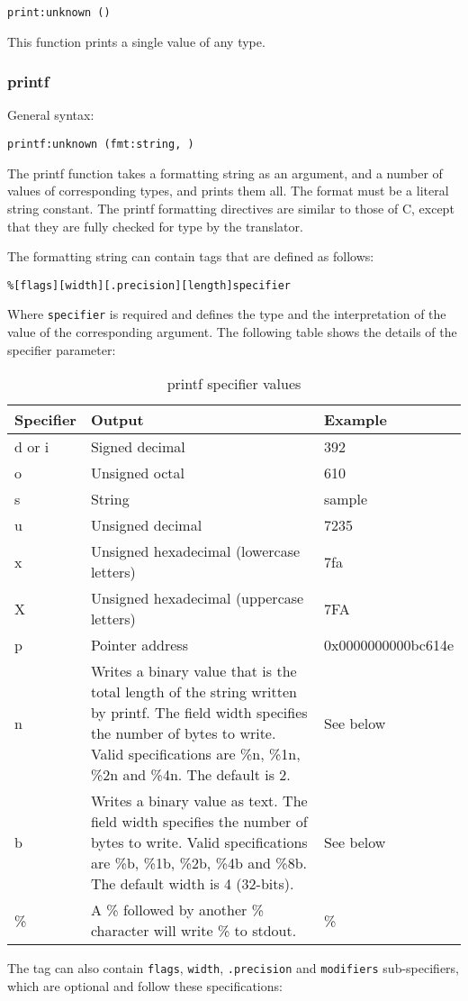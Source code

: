 \documentclass[twoside,english]{article}
\providecommand{\tabularnewline}{\\}
\newenvironment{vindent}
{\begin{list}{}{\setlength{\listparindent}{6pt}}
\item[]}
{\end{list}}
\begin{document}
\begin{vindent}
\begin{verbatim}
print:unknown ()
\end{verbatim}
\end{vindent}
This function prints a single value of any type.


\subsubsection{printf}
General syntax:

\begin{vindent}
\begin{verbatim}
printf:unknown (fmt:string, )
\end{verbatim}
\end{vindent}
The printf function takes a formatting string as an argument, and a number
of values of corresponding types, and prints them all. The format must be a
literal string constant. The printf formatting directives are similar to those
of C, except that they are fully checked for type by the translator.

The formatting string can contain tags that are defined as follows:

\begin{vindent}
\begin{verbatim}
%[flags][width][.precision][length]specifier
\end{verbatim}
\end{vindent}
Where \texttt{specifier} is required and defines the type and the interpretation
of the value of the corresponding argument. The following table shows the
details of the specifier parameter:

\begin{table}[H]
\caption{printf specifier values}
\begin{tabular}{|>{\raggedright}p{1in}|>{\raggedright}p{3.5in}|>{\raggedright}p{1.25in}|}
\hline
\textbf{Specifier}&
\textbf{Output}&
\textbf{Example}\tabularnewline
\hline
\hline 
d or i&
Signed decimal&
392\tabularnewline
\hline 
o&
Unsigned octal&
610\tabularnewline
\hline 
s&
String&
sample\tabularnewline
\hline 
u&
Unsigned decimal&
7235\tabularnewline
\hline 
x&
Unsigned hexadecimal (lowercase letters)&
7fa\tabularnewline
\hline 
X&
Unsigned hexadecimal (uppercase letters)&
7FA\tabularnewline
\hline 
p&
Pointer address&
0x0000000000bc614e\tabularnewline
\hline 
n&
Writes a binary value that is the total length of the string written by printf.
The field width specifies the number of bytes to write. Valid specifications
are \%n, \%1n, \%2n and \%4n. The default is 2.&
See below\tabularnewline
\hline 
b&
Writes a binary value as text. The field width specifies the number of bytes
to write. Valid specifications are \%b, \%1b, \%2b, \%4b and \%8b. The default
width is 4 (32-bits).&
See below\tabularnewline
\hline 
\%&
A \% followed by another \% character will write \% to stdout.&
\%\tabularnewline
\hline
\end{tabular}
\end{table}
The tag can also contain \texttt{flags}, \texttt{width}, \texttt{.precision}
and \texttt{modifiers} sub-specifiers, which are optional and follow these
specifications:
\end{document}

